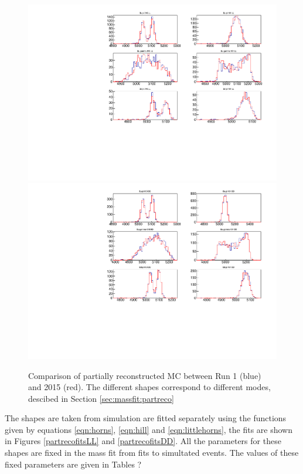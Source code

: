 \begin{figure}[!h]
\includegraphics[width=\linewidth]{figures/compareMC/run1vsrun2MC_partreco_LL.pdf}
\includegraphics[width=\linewidth]{figures/compareMC/run1vsrun2MC_partreco_DD.pdf}
\caption{Comparison of partially reconstructed MC between Run 1 (blue) and 2015 (red). The different shapes correspond to different \Dstar\Kstar modes, descibed in Section \ref{sec:massfit:partreco}}
\label{parterecofits}
\end{figure}

The shapes are taken from simulation are fitted separately using the functions given by equations \ref{eqn:horns}, \ref{eqn:hill} and \ref{eqn:littlehorns}, the fits are shown in Figures \ref{partrecofitsLL} and \ref{partrecofitsDD}. All the parameters for these shapes are fixed in the mass fit from fits to simultated events. The values of these fixed parameters are given in Tables ?

